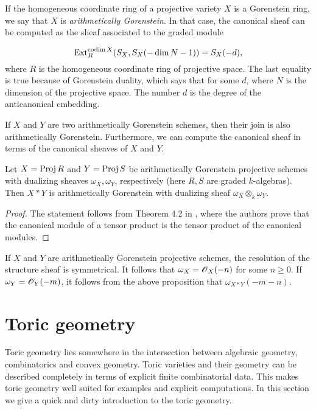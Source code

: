 If the homogeneous coordinate ring of a projective variety $X$ is a Gorenstein ring, we say that $X$ is \emph{arithmetically Gorenstein}. In that case, the canonical sheaf can be computed as the sheaf associated to the graded module

$$\operatorname{Ext}_R^{\operatorname{codim} X}(S_X,S_X(-\dim N-1))=S_X(-d),$$
where $R$ is the homogeneous coordinate ring of projective space. The last equality is true  because of Gorenstein duality, which says that for some $d$, where $N$ is the dimension of the projective space. The number $d$ is the degree of the anticanonical embedding. %

If $X$ and $Y$ are two arithmetically Gorenstein schemes, then their join is also arithmetically Gorenstein. Furthermore, we can compute the canonical sheaf in terms of the canonical sheaves of $X$ and $Y$.

\begin{proposition}
Let $X=\operatorname{Proj} R$ and $Y=\operatorname{Proj} S$ be arithmetically Gorenstein projective schemes with dualizing sheaves $\omega_X, \omega_Y$, respectively (here $R, S$ are graded $k$-algebras). Then $X \ast Y$ is arithmetically Gorenstein with dualizing sheaf $\omega_X \otimes_k \omega_Y$.
\end{proposition}

\begin{proof}
The statement follows from Theorem 4.2 in \cite{herzog_canonical}, where the authors prove that the canonical module of a tensor product is the tensor product of the canonical modules.
\end{proof}

\begin{remark}
\label{remark:canonical}
If $X$ and $Y$ are arithmetically Gorenstein projective schemes, the resolution of the structure sheaf is symmetrical. It follows that $\omega_X=\mathscr{O}_X(-n)$ for some $n \geq 0$. If $\omega_Y=\mathscr{O}_Y(-m)$, it follows from the above proposition that $\omega_{X \ast Y}(-m-n)$.
\end{remark}

\section{Toric geometry}
\label{sec:toric_geometry}

Toric geometry lies somewhere in the intersection between algebraic geometry, combinatorics and convex geometry. Toric varieties and their geometry can be described completely in terms of explicit finite combinatorial data. This makes toric geometry well suited for examples and explicit computations. In this section we give a quick and dirty introduction to the toric geometry.

